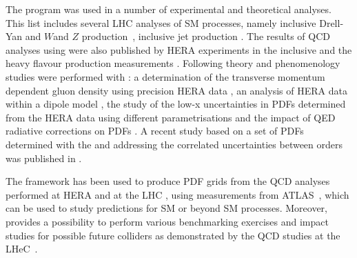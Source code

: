 The \fitter program was used in a number of experimental and theoretical analyses. 
This list includes several LHC analyses of SM processes, namely
inclusive Drell-Yan and $W$and $Z$ production~\cite{atlas:strange,cms:strange,atlas:hm,Aad:2014qja,Aad:2014xca},
inclusive jet production \cite{atlas:jets}.
The results of QCD analyses using \fitter were also
published by HERA experiments in the inclusive \cite{h1zeus:2009wt,h1:2012kk} and
the heavy flavour production measurements \cite{h1zeus:charm, Abramowicz:2014zub}.
Following theory and phenomenology studies were performed with \fitter:
a determination of the transverse momentum dependent gluon density using precision HERA data \cite{Jung2014}, 
an analysis of HERA data within a dipole model \cite{Luszczak:2013rxa},
the study of the low-x uncertainties in PDFs determined from the HERA data using 
different parametrisations \cite{Chebyshev} and the impact of QED radiative corrections on PDFs \cite{Sadykov:2014aua}.
A recent study based on a set of PDFs determined with the \fitter and addressing 
the correlated uncertainties between orders was published in \cite{hfcorrpaper}. 
%

The \fitter framework has been used to produce PDF grids from the QCD analyses performed at 
HERA \cite{h1zeus:2009wt,hera:grids} and at the LHC \cite{atlas:grids}, using 
measurements from ATLAS~\cite{atlas:strange,atlas:jets}, which can be used to study predictions for SM 
or beyond SM processes. Moreover, \fitter provides a possibility to perform various benchmarking exercises
\cite{Butterworth:2014efa} and impact studies for possible future colliders
as demonstrated by the QCD studies at the LHeC~\cite{lhec:studies}.







